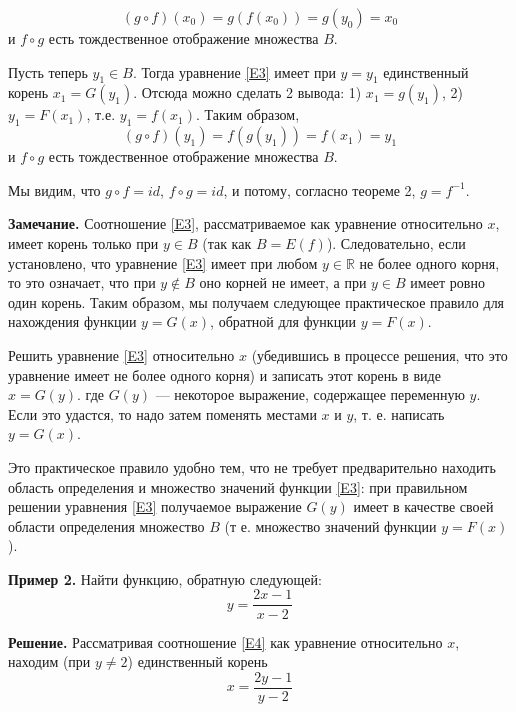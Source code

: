 \documentclass{article}
\begin{document}
$$(g\circ f)(x_0)=g(f(x_0))=g(y_0)=x_0$$
и $f\circ g$ есть тождественное отображение множества $B$.
\par Пусть теперь $y_1\in B$. Тогда уравнение \eqref{E3} имеет при $y=y_1$ единственный корень $x_1=G(y_1)$. Отсюда можно сделать 2 вывода: 1) $x_1=g(y_1)$, 2) $y_1=F(x_1)$, т.е. $y_1=f(x_1)$. Таким образом,
$$(g\circ f)(y_1)=f(g(y_1))=f(x_1)=y_1$$
и $f\circ g$ есть тождественное отображение множества $B$.
\par Мы видим, что $g\circ f=id$, $f\circ g=id$, и потому, согласно теореме 2, $g=f^{-1}$.
\par \textbf{Замечание.} Соотношение \eqref{E3}, рассматриваемое как уравнение относительно $x$, имеет корень только при $y\in B$ (так как $B = E(f)$). Следовательно, если установлено, что уравнение \eqref{E3} имеет при любом $y\in \mathbb{R}$ не более одного корня, то это означает, что при $y\notin B$ оно корней не имеет, а при $y\in B$ имеет ровно один корень. Таким образом, мы получаем следующее практическое правило для нахождения функции $y=G(x)$, обратной для функции $y=F(x).$
\par Решить уравнение \eqref{E3} относительно $x$ (убедившись в процессе решения, что это уравнение имеет не более одного корня) и записать этот корень в виде $x=G(y)$. где $G(y)$ — некоторое выражение, содержащее переменную $y$. Если это удастся, то надо затем поменять местами $x$ и $y$, т. е. написать $y=G(x)$.
\par Это практическое правило удобно тем, что не требует предварительно находить область определения и множество значений функции \eqref{E3}: при правильном решении уравнения \eqref{E3} получаемое выражение $G(y)$ имеет в качестве своей области определения множество $B$ (т е. множество значений функции $y=F(x)$).
\par\textbf{Пример 2.} Найти функцию, обратную следующей:
\begin{equation}\label{E4}
y=\frac{2x-1}{x-2}
\end{equation}
\par\textbf{Решение.} Рассматривая соотношение \eqref{E4} как уравнение относительно $x$, находим (при $y\ne 2$) единственный корень
$$x=\frac{2y-1}{y-2}$$
\end{document}
